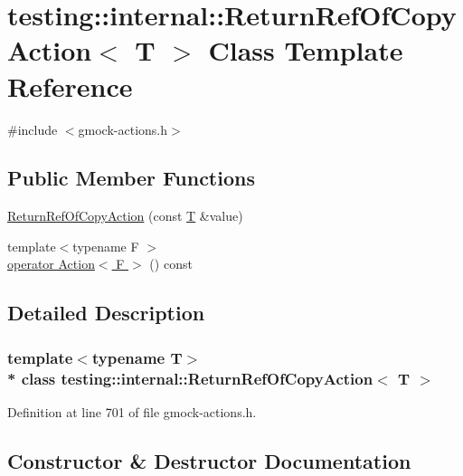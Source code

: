 \hypertarget{classtesting_1_1internal_1_1_return_ref_of_copy_action}{}\section{testing\+:\+:internal\+:\+:Return\+Ref\+Of\+Copy\+Action$<$ T $>$ Class Template Reference}
\label{classtesting_1_1internal_1_1_return_ref_of_copy_action}


{\ttfamily \#include $<$gmock-\/actions.\+h$>$}

\subsection*{Public Member Functions}
\begin{DoxyCompactItemize}
\item 
\hyperlink{classtesting_1_1internal_1_1_return_ref_of_copy_action_a073c18a8b50423b08f6603e860622839}{Return\+Ref\+Of\+Copy\+Action} (const \hyperlink{functions__7_8js_adf1f3edb9115acb0a1e04209b7a9937b}{T} \&value)
\item 
{\footnotesize template$<$typename F $>$ }\\\hyperlink{classtesting_1_1internal_1_1_return_ref_of_copy_action_a9d7625cff3c84eedcbbf8ad976d28814}{operator Action$<$ F $>$} () const 
\end{DoxyCompactItemize}


\subsection{Detailed Description}
\subsubsection*{template$<$typename T$>$\\*
class testing\+::internal\+::\+Return\+Ref\+Of\+Copy\+Action$<$ T $>$}



Definition at line 701 of file gmock-\/actions.\+h.



\subsection{Constructor \& Destructor Documentation}
